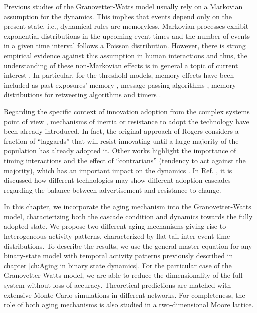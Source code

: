 Previous studies of the Granovetter-Watts model usually rely on a Markovian assumption for the dynamics. This implies that events depend only on the present state, i.e., dynamical rules are memoryless. Markovian processes exhibit exponential distributions in the upcoming event times and the number of events in a given time interval follows a Poisson distribution. However, there is strong empirical evidence against this assumption in human interactions and thus, the understanding of these non-Markovian effects is in general a topic of current interest \cite{van-mieghem-2013,starnini-2017,peralta-2020C,peralta-2020A}. In particular, for the threshold models, memory effects have been included as past exposures' memory \cite{dodds-2004}, message-passing algorithms \cite{shrestha-2014}, memory distributions for retweeting algorithms \cite{gleeson-2016} and timers \cite{oh-2018}.

Regarding the specific context of innovation adoption from the complex systems point of view \cite{przybyla2014diffusion}, mechanisms of inertia or resistance to adopt the technology have been already introduced. In fact, the original approach of Rogers \cite{rogers2014} considers a fraction of ``laggards'' that will resist innovating until a large majority of the population has already adopted it. Other works highlight the importance of timing interactions \cite{bass1969} and the effect of ``contrarians'' (tendency to act against the majority), which has an important impact on the dynamics \cite{galam-2008,goncalves-2012}. In Ref. \cite{goncalves-2012}, it is discussed how different technologies may show different adoption cascades regarding the balance between advertisement and resistance to change.

In this chapter, we incorporate the aging mechanism into the Granovetter-Watts model, characterizing both the cascade condition and dynamics towards the fully adopted state. We propose two different aging mechanisms giving rise to heterogeneous activity patterns, characterized by flat-tail inter-event time distributions. To describe the results, we use the general master equation for any binary-state model with temporal activity patterns previously described in chapter \ref{ch:Aging in binary state dynamics}. For the particular case of the Granovetter-Watts model, we are able to reduce the dimensionality of the full system without loss of accuracy. Theoretical predictions are matched with extensive Monte Carlo simulations in different networks. For completeness, the role of both aging mechanisms is also studied in a two-dimensional Moore lattice.

